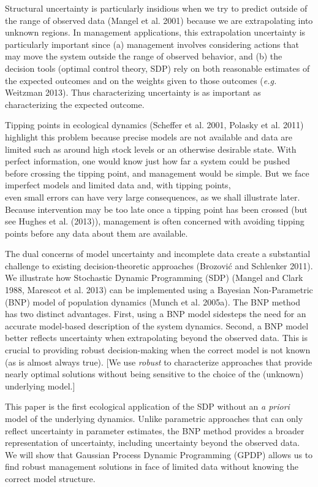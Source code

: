 \documentclass[author-year, 12pt,review]{components/elsarticle} %
\begin{document}
Structural uncertainty is particularly insidious when we try to predict
outside of the range of observed data (Mangel et al. 2001) because we
are extrapolating into unknown regions. In management applications, this
extrapolation uncertainty is particularly important since (a) management
involves considering actions that may move the system outside the range
of observed behavior, and (b) the decision tools (optimal control
theory, SDP) rely on both reasonable estimates of the expected outcomes
and on the weights given to those outcomes (\emph{e.g.} Weitzman 2013).
Thus characterizing uncertainty is as important as characterizing the
expected outcome.

Tipping points in ecological dynamics (Scheffer et al. 2001, Polasky et
al. 2011) highlight this problem because precise models are not
available and data are limited such as around high stock levels or an
otherwise desirable state. With perfect information, one would know just
how far a system could be pushed before crossing the tipping point, and
management would be simple. But we face imperfect models and limited
data and, with tipping points,\\even small errors can have very large
consequences, as we shall illustrate later. Because intervention may be
too late once a tipping point has been crossed (but see Hughes et al.
(2013)), management is often concerned with avoiding tipping points
before any data about them are available.

The dual concerns of model uncertainty and incomplete data create a
substantial challenge to existing decision-theoretic approaches
(Brozović and Schlenker 2011). We illustrate how Stochastic Dynamic
Programming (SDP) (Mangel and Clark 1988, Marescot et al. 2013) can be
implemented using a Bayesian Non-Parametric (BNP) model of population
dynamics (Munch et al. 2005a). The BNP method has two distinct
advantages. First, using a BNP model sidesteps the need for an accurate
model-based description of the system dynamics. Second, a BNP model
better reflects uncertainty when extrapolating beyond the observed data.
This is crucial to providing robust decision-making when the correct
model is not known (as is almost always true). {[}We use \emph{robust}
to characterize approaches that provide nearly optimal solutions without
being sensitive to the choice of the (unknown) underlying model.{]}

This paper is the first ecological application of the SDP without an
\emph{a priori} model of the underlying dynamics. Unlike parametric
approaches that can only reflect uncertainty in parameter estimates, the
BNP method provides a broader representation of uncertainty, including
uncertainty beyond the observed data. We will show that Gaussian Process
Dynamic Programming (GPDP) allows us to find robust management solutions
in face of limited data without knowing the correct model structure.
\end{document}
